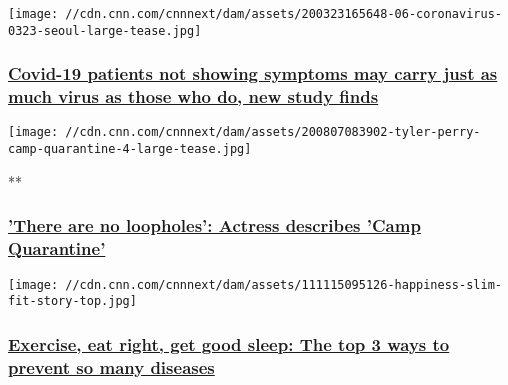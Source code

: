 \href{/2020/08/07/health/covid-asymptomatic-transmission-study-wellness/index.html}{}

\texttt{[image: //cdn.cnn.com/cnnnext/dam/assets/200323165648-06-coronavirus-0323-seoul-large-tease.jpg]}

\hypertarget{covid-19-patients-not-showing-symptoms-may-carry-just-as-much-virus-as-those-who-do-new-study-finds-1}{%
\subsubsection{\texorpdfstring{\href{/2020/08/07/health/covid-asymptomatic-transmission-study-wellness/index.html}{Covid-19
patients not showing symptoms may carry just as much virus as those who
do, new study
finds}}{Covid-19 patients not showing symptoms may carry just as much virus as those who do, new study finds}}\label{covid-19-patients-not-showing-symptoms-may-carry-just-as-much-virus-as-those-who-do-new-study-finds-1}}

\href{/videos/health/2020/08/07/tyler-perry-camp-quarantine-coronavirus-studio-gupta-newday-vpx.cnn}{}

\texttt{[image: //cdn.cnn.com/cnnnext/dam/assets/200807083902-tyler-perry-camp-quarantine-4-large-tease.jpg]}

**

\hypertarget{there-are-no-loopholes-actress-describes-camp-quarantine}{%
\subsubsection{\texorpdfstring{\href{/videos/health/2020/08/07/tyler-perry-camp-quarantine-coronavirus-studio-gupta-newday-vpx.cnn}{'There
are no loopholes': Actress describes 'Camp
Quarantine'}}{'There are no loopholes': Actress describes 'Camp Quarantine'}}\label{there-are-no-loopholes-actress-describes-camp-quarantine}}

\href{/2020/08/07/health/exercise-sleep-prevent-disease-wellness/index.html}{}

\texttt{[image: //cdn.cnn.com/cnnnext/dam/assets/111115095126-happiness-slim-fit-story-top.jpg]}

\hypertarget{exercise-eat-right-get-good-sleep-the-top-3-ways-to-prevent-so-many-diseases-1}{%
\subsubsection{\texorpdfstring{\href{/2020/08/07/health/exercise-sleep-prevent-disease-wellness/index.html}{Exercise,
eat right, get good sleep: The top 3 ways to prevent so many
diseases}}{Exercise, eat right, get good sleep: The top 3 ways to prevent so many diseases}}\label{exercise-eat-right-get-good-sleep-the-top-3-ways-to-prevent-so-many-diseases-1}}

